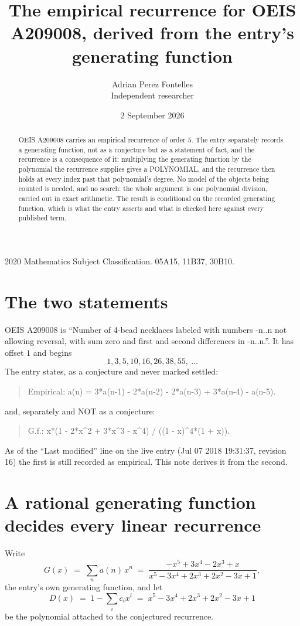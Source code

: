 \documentclass[11pt,a4paper]{article}
\title{The empirical recurrence for OEIS A209008, derived from the entry's generating function}
\author{Adrian Perez Fontelles\\ \small Independent researcher}
\date{2 September 2026}
\theoremstyle{plain}
\theoremstyle{definition}
\begin{document}
\maketitle

\begin{abstract}
OEIS A209008 carries an empirical recurrence of order $5$. The entry separately records a
generating function, not as a conjecture but as a statement of fact, and the recurrence is a
consequence of it: multiplying the generating function by the polynomial the recurrence
supplies gives a POLYNOMIAL, and the recurrence then holds at every index past that
polynomial's degree. No model of the objects being counted is needed, and no search: the
whole argument is one polynomial division, carried out in exact arithmetic. The result is
conditional on the recorded generating function, which is what the entry asserts and what is
checked here against every published term.
\end{abstract}

\noindent\small 2020 Mathematics Subject Classification. 05A15, 11B37, 30B10.\normalsize

\section{The two statements}

OEIS A209008 is ``Number of 4-bead necklaces labeled with numbers -n..n not allowing reversal, with sum zero and first and second differences in -n..n.''. It has offset $1$ and begins
\[
1, 3, 5, 10, 16, 26, 38, 55,\ \dots
\]
The entry states, as a conjecture and never marked settled:
\begin{quote}
Empirical: a(n) = 3*a(n-1) - 2*a(n-2) - 2*a(n-3) + 3*a(n-4) - a(n-5).
\end{quote}
and, separately and NOT as a conjecture:
\begin{quote}
G.f.: x*(1 - 2*x\^{}2 + 3*x\^{}3 - x\^{}4) / ((1 - x)\^{}4*(1 + x)).
\end{quote}
As of the ``Last modified'' line on the live entry (Jul 07 2018 19:31:37, revision 16) the first is still
recorded as empirical. This note derives it from the second.

\section{A rational generating function decides every linear recurrence}

Write
\[
G(x)\;=\;\sum_{n}a(n)\,x^{n}\;=\;\frac{- x^{5} + 3 x^{4} - 2 x^{3} + x}{x^{5} - 3 x^{4} + 2 x^{3} + 2 x^{2} - 3 x + 1},
\]
the entry's own generating function, and let
\[
D(x)\;=\;1-\sum_i c_i x^{i}\;=\;x^{5} - 3 x^{4} + 2 x^{3} + 2 x^{2} - 3 x + 1
\]
be the polynomial attached to the conjectured recurrence.
\end{document}
